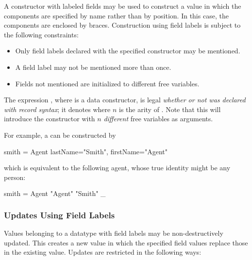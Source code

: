 A constructor with labeled fields may be used to construct a value in
which the components are specified by name rather than by
position. In this case, the components are enclosed by braces.
Construction using field labels is subject to the following
constraints:
%
\begin{itemize}
\item Only field labels declared with the specified constructor may be
  mentioned.
\item A field label may not be mentioned more than once.
\item Fields not mentioned are initialized to different free variables.
\end{itemize}
%
The expression , where  is a data constructor,
is legal \emph{whether or not   was declared with record syntax};
it denotes 
where $n$ is the arity of .
Note that this will introduce the constructor  with
$n$ \emph{different} free variables as arguments.


\noindent
For example, a  can be constructed by
\begin{curry}
smith = Agent {lastName="Smith", firstName="Agent"}
\end{curry}
which is equivalent to the following agent, whose true identity
might be any person:
\begin{curry}
smith = Agent "Agent" "Smith" _
\end{curry}

\subsubsection{Updates Using Field Labels}\label{flab-upd}

Values belonging to a datatype with field labels may be
non-destructively updated. This creates a new value in which the
specified field values replace those in the existing value. Updates
are restricted in the following ways:

